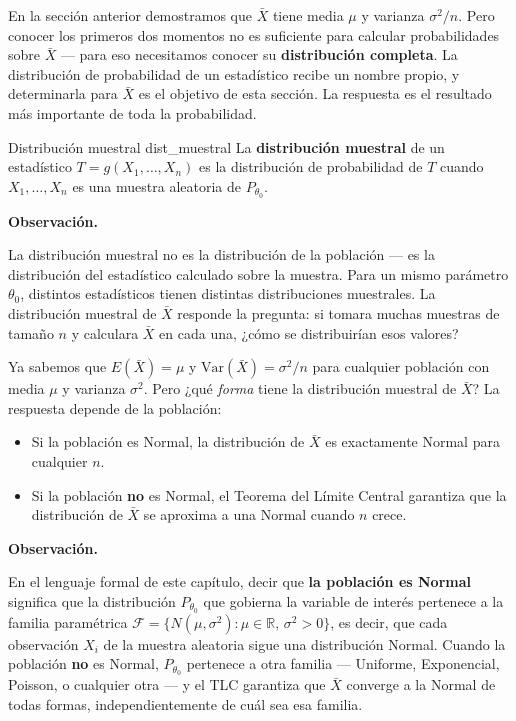 \documentclass[12pt, a4paper]{book}
\newenvironment{observacion}{%
    \par\medskip\noindent\textbf{\color{azul}Observaci\'{o}n.}\enspace\itshape
}{\par\medskip}
\numberwithin{equation}{chapter}
\begin{document}
En la secci\'{o}n anterior demostramos que $\bar{X}$
tiene media $\mu$ y varianza $\sigma^2/n$. Pero conocer
los primeros dos momentos no es suficiente para calcular
probabilidades sobre $\bar{X}$ --- para eso necesitamos
conocer su \textbf{distribuci\'{o}n completa}. La
distribuci\'{o}n de probabilidad de un estad\'{i}stico
recibe un nombre propio, y determinarla para $\bar{X}$
es el objetivo de esta secci\'{o}n. La respuesta es el
resultado m\'{a}s importante de toda la probabilidad.

\begin{definicion}{Distribuci\'{o}n muestral}
	{dist_muestral}
	La \textbf{distribuci\'{o}n muestral} de un
	estad\'{i}stico $T = g(X_1, \ldots, X_n)$ es la
	distribuci\'{o}n de probabilidad de $T$ cuando
	$X_1, \ldots, X_n$ es una muestra aleatoria de
	$P_{\theta_0}$.
\end{definicion}

\begin{observacion}
	La distribuci\'{o}n muestral no es la distribuci\'{o}n
	de la poblaci\'{o}n --- es la distribuci\'{o}n del
	estad\'{i}stico calculado sobre la muestra. Para un
	mismo par\'{a}metro $\theta_0$, distintos estad\'{i}sticos
	tienen distintas distribuciones muestrales. La
	distribuci\'{o}n muestral de $\bar{X}$ responde la
	pregunta: si tomara muchas muestras de tama\~{n}o $n$
	y calculara $\bar{X}$ en cada una, ¿c\'{o}mo se
	distribuir\'{i}an esos valores?
\end{observacion}

Ya sabemos que $E(\bar{X}) = \mu$ y
$\mathrm{Var}(\bar{X}) = \sigma^2/n$ para cualquier
poblaci\'{o}n con media $\mu$ y varianza $\sigma^2$.
Pero ¿qu\'{e} \emph{forma} tiene la distribuci\'{o}n
muestral de $\bar{X}$? La respuesta depende de la
poblaci\'{o}n:

\begin{itemize}[leftmargin=2em]
	\item Si la poblaci\'{o}n es Normal, la distribuci\'{o}n
	de $\bar{X}$ es exactamente Normal para cualquier $n$.
	\item Si la poblaci\'{o}n \textbf{no} es Normal,
	el Teorema del L\'{i}mite Central garantiza que la
	distribuci\'{o}n de $\bar{X}$ se aproxima a una
	Normal cuando $n$ crece.
\end{itemize}

\begin{observacion}
	En el lenguaje formal de este cap\'{i}tulo, decir
	que \textbf{la poblaci\'{o}n es Normal} significa
	que la distribuci\'{o}n $P_{\theta_0}$ que gobierna
	la variable de inter\'{e}s pertenece a la familia
	param\'{e}trica $\mathcal{F} = \{N(\mu, \sigma^2) :
	\mu \in \mathbb{R},\, \sigma^2 > 0\}$, es decir,
	que cada observaci\'{o}n $X_i$ de la muestra
	aleatoria sigue una distribuci\'{o}n Normal. Cuando
	la poblaci\'{o}n \textbf{no} es Normal, $P_{\theta_0}$
	pertenece a otra familia --- Uniforme, Exponencial,
	Poisson, o cualquier otra --- y el TLC garantiza
	que $\bar{X}$ converge a la Normal de todas formas,
	independientemente de cu\'{a}l sea esa familia.
\end{observacion}
\end{document}
